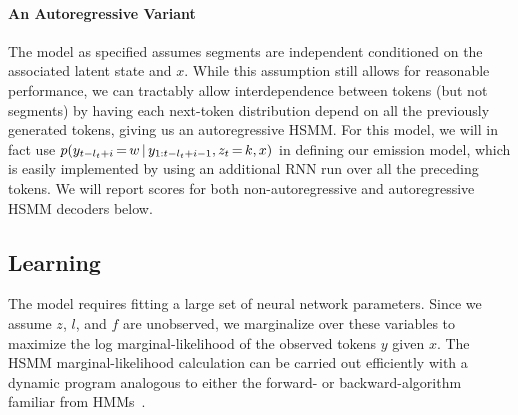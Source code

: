 \documentclass[11pt,a4paper]{article}
\begin{document}
\paragraph{An Autoregressive Variant} The model as specified assumes segments are independent conditioned on the associated latent state and $x$. While this assumption still allows for reasonable performance, we can tractably allow interdependence between tokens (but not segments) by having each next-token distribution depend on all the previously generated tokens, giving us an autoregressive HSMM. For this model, we will in fact use $p(y_{t-l_t+i} \, {=} \, w \,|\, y_{1:t-l_t+i-1}, z_t \, {=} \, k, x)$ in defining our emission model, which is easily implemented by using an additional RNN run over all the preceding tokens. We will report scores for both non-autoregressive and autoregressive HSMM decoders below.

\subsection{Learning}
\label{sec:learning}
The model requires fitting a large set of neural network parameters. 
Since we assume $z$, $l$, and $f$ are unobserved, we marginalize over these variables to maximize the log marginal-likelihood of the observed tokens $y$ given $x$. %
The HSMM marginal-likelihood calculation can be carried out efficiently with a dynamic program analogous to either the forward- or backward-algorithm familiar from HMMs~\citep{rabiner1989tutorial}. 
\end{document}
